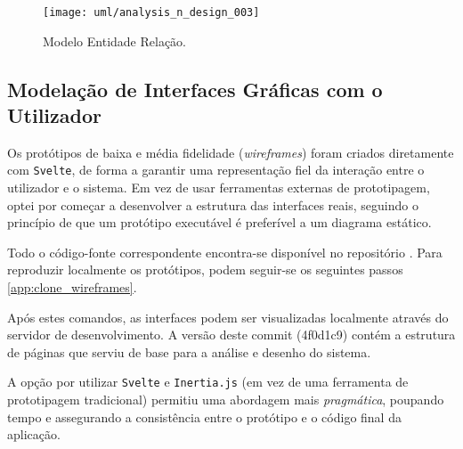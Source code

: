 \documentclass[12pt,a4paper,openright,oneside]{memoir}
\begin{document}
\begin{figure}[H]
  \centering
  \texttt{[image: uml/analysis\_n\_design\_003]}
  \caption{Modelo Entidade Relação.}
  \label{fig:er_diagram}
\end{figure}

\subsection{Modelação de Interfaces Gráficas com o Utilizador}


Os protótipos de baixa e média fidelidade (\textit{wireframes}) foram criados
diretamente com \texttt{Svelte}, de forma a garantir uma representação fiel da
interação entre o utilizador e o sistema. Em vez de usar ferramentas externas
de prototipagem, optei por começar a desenvolver a estrutura das interfaces
reais, seguindo o princípio de que um protótipo executável é preferível a um
diagrama estático.

Todo o código-fonte correspondente encontra-se disponível no repositório
\autocite{repo}. Para reproduzir localmente os protótipos, podem seguir-se os
seguintes passos \ref{app:clone_wireframes}.

Após estes comandos, as interfaces podem ser visualizadas localmente através do
servidor de desenvolvimento. A versão deste commit (4f0d1c9) contém a estrutura
de páginas que serviu de base para a análise e desenho do sistema.

A opção por utilizar \texttt{Svelte} e \texttt{Inertia.js} (em vez de uma
ferramenta de prototipagem tradicional) permitiu uma abordagem mais
\textit{pragmática}, poupando tempo e assegurando a consistência entre o
protótipo e o código final da aplicação.
\end{document}
